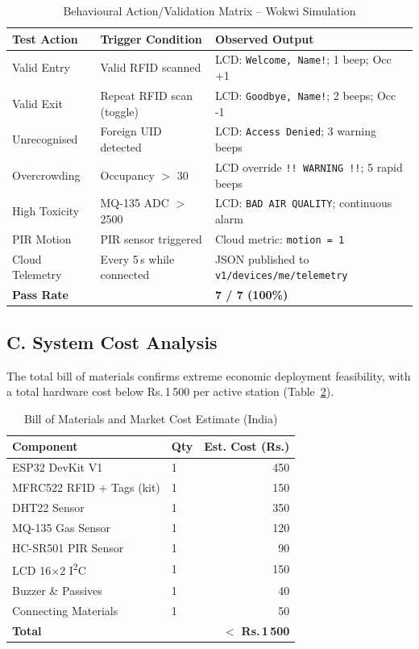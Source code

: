 \documentclass[12pt,a4paper]{article}
\begin{document}
\begin{table}[H]
\centering
\caption{Behavioural Action/Validation Matrix -- Wokwi Simulation}
\label{tab:validation}
\begin{tabularx}{\linewidth}{@{}lXX@{}}
\toprule
\textbf{Test Action} & \textbf{Trigger Condition} & \textbf{Observed Output} \\
\midrule
Valid Entry      & Valid RFID scanned              & LCD: \texttt{Welcome, Name!}; 1 beep; Occ +1 \\
Valid Exit       & Repeat RFID scan (toggle)       & LCD: \texttt{Goodbye, Name!}; 2 beeps; Occ -1 \\
Unrecognised     & Foreign UID detected            & LCD: \texttt{Access Denied}; 3 warning beeps \\
Overcrowding     & Occupancy $>$ 30                & LCD override \texttt{!! WARNING !!}; 5 rapid beeps \\
High Toxicity    & MQ-135 ADC $>$ 2500             & LCD: \texttt{BAD AIR QUALITY}; continuous alarm \\
PIR Motion       & PIR sensor triggered            & Cloud metric: \texttt{motion = 1} \\
Cloud Telemetry  & Every 5\,s while connected      & JSON published to \texttt{v1/devices/me/telemetry} \\
\midrule
\multicolumn{2}{l}{\textbf{Pass Rate}} & \textbf{7 / 7 (100\%)} \\
\bottomrule
\end{tabularx}
\end{table}

\subsection*{C. System Cost Analysis}

The total bill of materials confirms extreme economic deployment feasibility, with a
total hardware cost below Rs.\,1\,500 per active station (Table~\ref{tab:bom}).

\begin{table}[H]
\centering
\caption{Bill of Materials and Market Cost Estimate (India)}
\label{tab:bom}
\begin{tabular}{@{}llr@{}}
\toprule
\textbf{Component} & \textbf{Qty} & \textbf{Est. Cost (Rs.)} \\
\midrule
ESP32 DevKit V1          & 1   & 450 \\
MFRC522 RFID + Tags (kit)& 1   & 150 \\
DHT22 Sensor             & 1   & 350 \\
MQ-135 Gas Sensor        & 1   & 120 \\
HC-SR501 PIR Sensor      & 1   &  90 \\
LCD 16$\times$2 I\textsuperscript{2}C          & 1   & 150 \\
Buzzer \& Passives       & 1   &  40 \\
Connecting Materials     & 1   &  50 \\
\midrule
\textbf{Total}           &     & $<$ \textbf{Rs.\,1\,500} \\
\bottomrule
\end{tabular}
\end{table}
\end{document}
